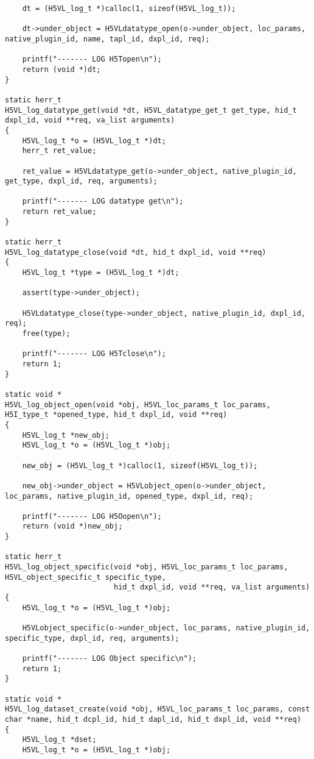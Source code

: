 \begin{appendices}
\begin{lstlisting}
    dt = (H5VL_log_t *)calloc(1, sizeof(H5VL_log_t));

    dt->under_object = H5VLdatatype_open(o->under_object, loc_params, native_plugin_id, name, tapl_id, dxpl_id, req);

    printf("------- LOG H5Topen\n");
    return (void *)dt;
}

static herr_t 
H5VL_log_datatype_get(void *dt, H5VL_datatype_get_t get_type, hid_t dxpl_id, void **req, va_list arguments)
{
    H5VL_log_t *o = (H5VL_log_t *)dt;
    herr_t ret_value;

    ret_value = H5VLdatatype_get(o->under_object, native_plugin_id, get_type, dxpl_id, req, arguments);

    printf("------- LOG datatype get\n");
    return ret_value;
}

static herr_t 
H5VL_log_datatype_close(void *dt, hid_t dxpl_id, void **req)
{
    H5VL_log_t *type = (H5VL_log_t *)dt;

    assert(type->under_object);

    H5VLdatatype_close(type->under_object, native_plugin_id, dxpl_id, req);
    free(type);

    printf("------- LOG H5Tclose\n");
    return 1;
}

static void *
H5VL_log_object_open(void *obj, H5VL_loc_params_t loc_params, H5I_type_t *opened_type, hid_t dxpl_id, void **req)
{
    H5VL_log_t *new_obj;
    H5VL_log_t *o = (H5VL_log_t *)obj;

    new_obj = (H5VL_log_t *)calloc(1, sizeof(H5VL_log_t));
    
    new_obj->under_object = H5VLobject_open(o->under_object, loc_params, native_plugin_id, opened_type, dxpl_id, req);

    printf("------- LOG H5Oopen\n");
    return (void *)new_obj;
}

static herr_t 
H5VL_log_object_specific(void *obj, H5VL_loc_params_t loc_params, H5VL_object_specific_t specific_type, 
                         hid_t dxpl_id, void **req, va_list arguments)
{
    H5VL_log_t *o = (H5VL_log_t *)obj;

    H5VLobject_specific(o->under_object, loc_params, native_plugin_id, specific_type, dxpl_id, req, arguments);

    printf("------- LOG Object specific\n");
    return 1;
}

static void *
H5VL_log_dataset_create(void *obj, H5VL_loc_params_t loc_params, const char *name, hid_t dcpl_id, hid_t dapl_id, hid_t dxpl_id, void **req) 
{
    H5VL_log_t *dset;
    H5VL_log_t *o = (H5VL_log_t *)obj;


\end{lstlisting}
\end{appendices}
